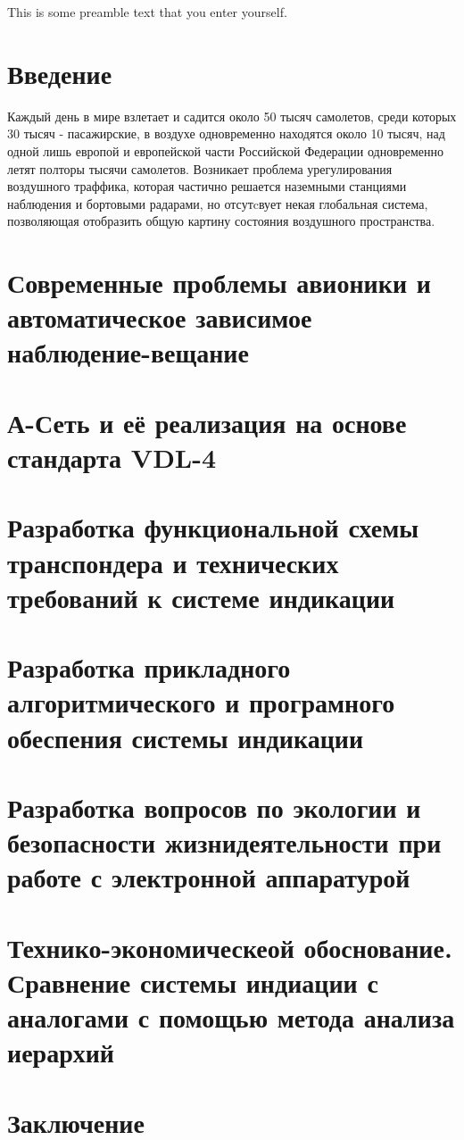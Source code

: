 \documentclass[a4paper,14pt]{report} %
\begin{document}
\tableofcontents
This is some  preamble  text  that  you  enter  yourself.
\section{Введение} %
Каждый день в мире взлетает и садится около 50 тысяч самолетов, среди
которых 30 тысяч - пасажирские, в воздухе одновременно находятся около 10 тысяч,
над одной лишь европой и европейской части Российской Федерации одновременно
летят полторы тысячи самолетов. Возникает проблема урегулирования воздушного
траффика, которая частично решается наземными станциями наблюдения и бортовыми
радарами, но отсутcвует некая глобальная система, позволяющая отобразить
общую картину состояния воздушного пространства.
\section{Современные проблемы авионики и автоматическое зависимое
  наблюдение-вещание} %
\lipsum [2-3]
\section{А-Сеть и её реализация на основе стандарта VDL-4} %
\lipsum [4-5]
\section{Разработка функциональной схемы транспондера и технических требований к
  системе индикации} %
\lipsum [6]
\section{Разработка прикладного алгоритмического и програмного обеспения
  системы индикации} %
\lipsum [7]
\section{Разработка вопросов по экологии и безопасности жизнидеятельности при
  работе с электронной аппаратурой} %
\lipsum [1]
\section{Технико-экономическеой обоснование. Сравнение системы индиации с
  аналогами с помощью метода анализа иерархий} %
\lipsum [1]
\section{Заключение}
\end{document}
